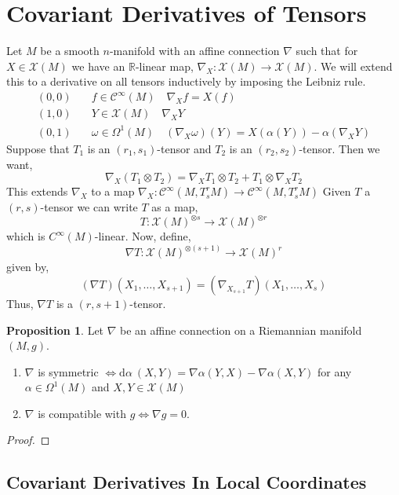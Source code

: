 \documentclass[12pt]{extarticle}
\newcommand{\R}{\mathbb{R}}
\renewcommand{\d}[1]{ \mathrm{d}#1 \:}
\theoremstyle{definition}
\newtheorem{proposition}[theorem]{Proposition}
\newcommand{\C}[1]{\mathcal{C}^{#1}}
\begin{document}
\section{Covariant Derivatives of Tensors}

Let $M$ be a smooth $n$-manifold with an affine connection $\nabla$ such that for $X \in \mathscr{X}(M)$ we have an $\R$-linear map, $\nabla_X : \mathscr{X}(M) \to \mathscr{X}(M)$. 
We will extend this to a derivative on all tensors inductively by imposing the Leibniz rule.
\begin{align*}
(0,0) \quad & f \in \C{\infty}(M) \quad \nabla_X f = X(f) 
\\
(1, 0) \quad & Y \in \mathscr{X}(M) \quad \nabla_X Y
\\
(0, 1) \quad & \omega \in \Omega^1(M) \quad (\nabla_X \omega)(Y) = X(\alpha(Y)) - \alpha(\nabla_X Y)
\end{align*} 
Suppose that $T_1$ is an $(r_1, s_1)$-tensor and $T_2$ is an $(r_2, s_2)$-tensor. Then we want,
\[ \nabla_X (T_1 \otimes T_2) = \nabla_X T_1 \otimes T_2 + T_1 \otimes \nabla_X T_2 \]
This extends $\nabla_X$ to a map $\nabla_X : \C{\infty}(M, T^{r}_s M) \to \C{\infty}(M, T^r_s M)$ 
Given $T$ a $(r, s)$-tensor we can write $T$ as a map,
\[ T : \mathscr{X}(M)^{\otimes s} \to \mathscr{X}(M)^{\otimes r} \]
which is $C^{\infty}(M)$-linear. Now, define,
\[ \nabla T : \mathscr{X}(M)^{\otimes (s + 1)} \to \mathscr{X}(M)^{r} \]
given by,
\[ (\nabla T)(X_1, \dots, X_{s+1}) = (\nabla_{X_{s+1}} T)(X_1, \dots, X_s) \]
Thus, $\nabla T$ is a $(r, s + 1)$-tensor. 

\begin{proposition}
Let $\nabla$ be an affine connection on a Riemannian manifold $(M, g)$.
\begin{enumerate}
\item $\nabla$ is symmetric $\iff \d{\alpha}(X, Y) = \nabla \alpha(Y, X) - \nabla \alpha(X, Y)$ for any $\alpha \in \Omega^1(M)$ and $X,Y \in \mathscr{X}(M)$
\item $\nabla$ is compatible with $g \iff \nabla g = 0$.
\end{enumerate}
\end{proposition}

\begin{proof}

\end{proof}

\subsection{Covariant Derivatives In Local Coordinates}
\end{document}

